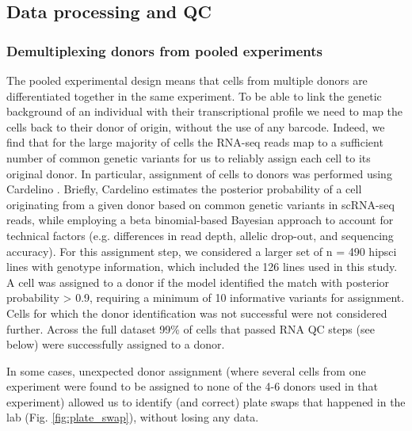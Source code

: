 
\subsection{Data processing and QC}
 

\subsubsection{Demultiplexing donors from pooled experiments} 

The pooled experimental design means that cells from multiple donors are differentiated together in the same experiment. 
To be able to link the genetic background of an individual with their transcriptional profile we need to map the cells back to their donor of origin, without the use of any barcode.
Indeed, we find that for the large majority of cells the RNA-seq reads map to a sufficient number of common genetic variants for us to reliably assign each cell to its original donor.
In particular, assignment of cells to donors was performed using Cardelino \cite{mccarthy2020cardelino}. 
Briefly, Cardelino estimates the posterior probability of a cell originating from a given donor based on common genetic variants in scRNA-seq reads, while employing a beta binomial-based Bayesian approach to account for technical factors (e.g. differences in read depth, allelic drop-out, and sequencing accuracy). 
For this assignment step, we considered a larger set of n = 490 \gls{hipsci} lines with genotype information, which included the 126 lines used in this study. 
A cell was assigned to a donor if the model identified the match with posterior probability > 0.9, requiring a minimum of 10 informative variants for assignment. 
Cells for which the donor identification was not successful were not considered further.
Across the full dataset 99\% of cells that passed RNA QC steps (see below) were successfully assigned to a donor.

In some cases, unexpected donor assignment (where several cells from one experiment were found to be assigned to none of the 4-6 donors used in that experiment) allowed us to identify (and correct) plate swaps that happened in the lab (Fig. \ref{fig:plate_swap}), without losing any data.

